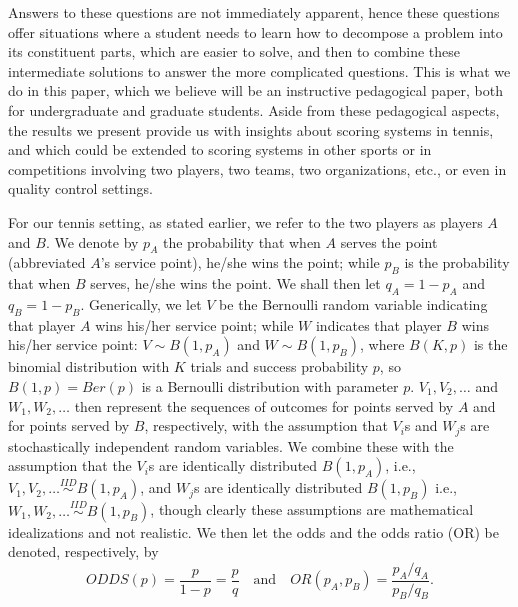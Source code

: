 \documentclass[11pt]{article}
\theoremstyle{plain}
\theoremstyle{definition}
\begin{document}
Answers to these questions are not immediately apparent, hence these questions offer situations where a student needs to learn how to decompose a problem into its constituent parts, which are easier to solve, and then to combine these intermediate solutions to answer the more complicated questions. This is what we do in this paper, which we believe will be an instructive pedagogical paper, both for undergraduate and graduate students. Aside from these pedagogical aspects, the results we present provide us with insights about scoring systems in tennis, and which could be extended to scoring systems in other sports or in competitions involving two players, two teams, two organizations, etc., or even in quality control settings.

For our tennis setting, as stated earlier, we refer to the two players as players $A$ and $B$. We denote by $p_A$ the probability that when $A$ serves the point (abbreviated $A$'s service point), he/she wins the point; while $p_B$ is the probability that when $B$ serves, he/she wins the point. We shall then let $q_A = 1 - p_A$ and $q_B = 1 - p_B$. Generically, we let $V$ be the Bernoulli random variable indicating that player $A$ wins his/her service point; while $W$ indicates that player $B$ wins his/her service point: $V\sim B(1,p_A)$ and $W \sim B(1,p_B)$, where $B(K,p)$ is the binomial distribution with $K$ trials and success probability $p$, so $B(1,p) = Ber(p)$ is a Bernoulli distribution with parameter $p$. $V_1, V_2, \ldots$ and $W_1, W_2, \ldots$ then represent the sequences of outcomes for points served by $A$ and for points served by $B$, respectively, with the assumption that $V_i$s and $W_j$s are stochastically independent random variables. We combine these with the assumption that the $V_i$s are identically distributed $B(1,p_A)$, i.e., $V_1,V_2, \ldots \stackrel{IID}{\sim} B(1,p_A)$, and $W_j$s are identically distributed $B(1,p_B)$ i.e., $W_1,W_2, \ldots \stackrel{IID}{\sim} B(1,p_B)$, though clearly these assumptions are mathematical idealizations and not realistic.
%
We then let the odds and the odds ratio (OR) be denoted, respectively, by
%
$$ODDS(p) = \frac{p}{1-p} = \frac{p}{q} \quad \mbox{and} \quad
OR(p_A,p_B) = \frac{p_A/q_A}{p_B/q_B}.$$
%
\end{document}
